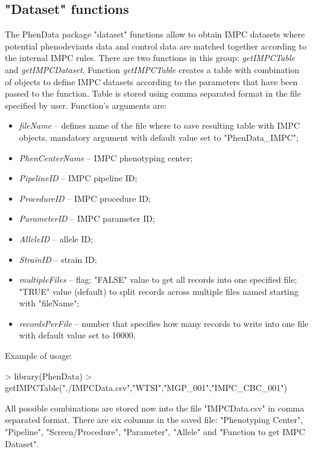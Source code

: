 \documentclass[a4paper]{article}
\begin{document}
\subsection*{"Dataset" functions}
The PhenData package "dataset" functions allow to obtain IMPC datasets where potential phenodeviants data and control data are matched together according to the internal IMPC rules. There are two functions in this group:  \textit{getIMPCTable} and  \textit{getIMPCDataset}.
\newline\newline
Function \textit{getIMPCTable} creates a table with combination of objects to define IMPC datasets according to the parameters that have been passed to the function. Table is stored using comma separated format in the file specified by user.  Function's arguments are:
\begin{itemize}
\item \textit{fileName} -- defines name of the file where to save resulting table with IMPC objects, mandatory argument with default value set to "PhenData\_IMPC"; 
\item \textit{PhenCenterName} -- IMPC phenotyping center; 
\item \textit{PipelineID} -- IMPC pipeline ID;
\item \textit{ProcedureID} -- IMPC procedure ID;
\item \textit{ParameterID} -- IMPC parameter ID;
\item \textit{AlleleID} -- allele ID;
\item \textit{StrainID} -- strain ID;
\item \textit{multipleFiles} -- flag: "FALSE" value to get all records into one specified file; "TRUE" value (default) to split records across multiple files named starting with "fileName";
\item \textit{recordsPerFile} -- number that specifies how many records to write into one file with default value set to 10000.
\end{itemize}
Example of usage: 
\begin{Schunk}
\begin{Sinput}
> library(PhenData)
> getIMPCTable("./IMPCData.csv","WTSI","MGP_001","IMPC_CBC_001")  
\end{Sinput}
\end{Schunk}
All possible combinations are stored now into the file "IMPCData.csv" in comma separated format. 
There are six columns in the saved file: "Phenotyping Center", "Pipeline", "Screen/Procedure", "Parameter", "Allele" and "Function to get IMPC Dataset". 
\end{document}

